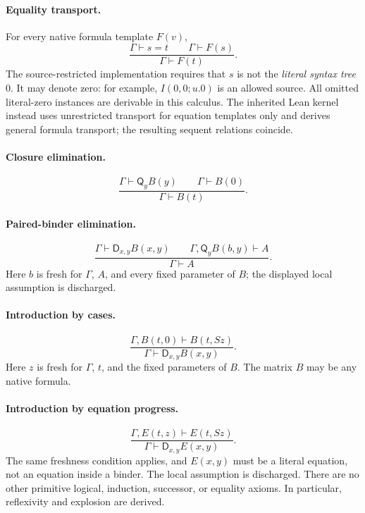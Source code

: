 \documentclass[11pt]{article}
\theoremstyle{definition}\newtheorem{definition}[theorem]{Definition}
\theoremstyle{remark}\newtheorem{remark}[theorem]{Remark}
\newcommand{\Q}{\mathsf Q}
\newcommand{\D}{\mathsf D}
\begin{document}
\paragraph{Equality transport.}
For every native formula template $F(v)$,
\[
 \frac{\Gamma\vdash s=t\qquad\Gamma\vdash F(s)}
      {\Gamma\vdash F(t)}.
 \tag{Tr}
\]
The source-restricted implementation requires that $s$ is not the
\emph{literal syntax tree} $0$. It may denote zero: for example,
$I(0,0;u.0)$ is an allowed source. All omitted literal-zero instances
are derivable in this calculus. The inherited Lean kernel instead uses
unrestricted transport for equation templates only and derives general
formula transport; the resulting sequent relations coincide.

\paragraph{Closure elimination.}
\[
 \frac{\Gamma\vdash\Q_yB(y)\qquad\Gamma\vdash B(0)}
      {\Gamma\vdash B(t)}.
 \tag{QE}
\]

\paragraph{Paired-binder elimination.}
\[
 \frac{\Gamma\vdash\D_{x,y}B(x,y)\qquad
       \Gamma,\Q_yB(b,y)\vdash A}
      {\Gamma\vdash A}.
 \tag{DE}
\]
Here $b$ is fresh for $\Gamma$, $A$, and every fixed parameter of $B$;
the displayed local assumption is discharged.

\paragraph{Introduction by cases.}
\[
 \frac{\Gamma,B(t,0)\vdash B(t,Sz)}
      {\Gamma\vdash\D_{x,y}B(x,y)}.
 \tag{DI-case}
\]
Here $z$ is fresh for $\Gamma$, $t$, and the fixed parameters of $B$.
The matrix $B$ may be any native formula.

\paragraph{Introduction by equation progress.}
\[
 \frac{\Gamma,E(t,z)\vdash E(t,Sz)}
      {\Gamma\vdash\D_{x,y}E(x,y)}.
 \tag{DI-progress}
\]
The same freshness condition applies, and $E(x,y)$ must be a literal
equation, not an equation inside a binder. The local assumption is
discharged. There are no other primitive logical, induction, successor,
or equality axioms. In particular, reflexivity and explosion are derived.
\end{document}
